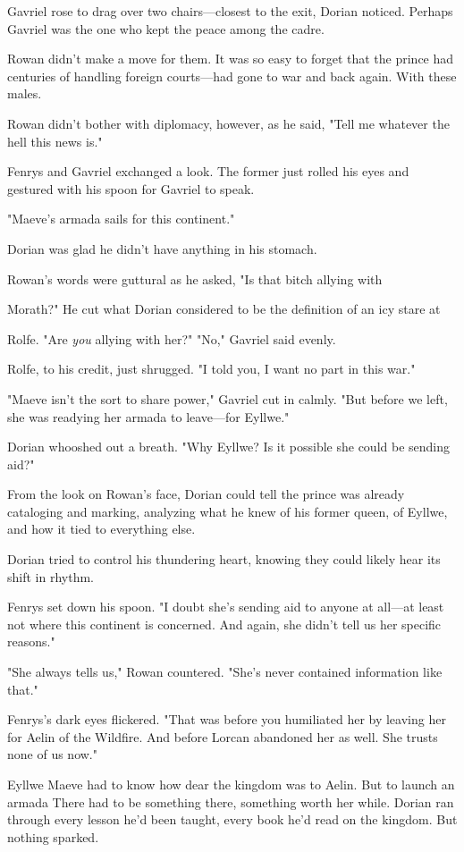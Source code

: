 Gavriel rose to drag over two chairs---closest to the exit, Dorian noticed. Perhaps Gavriel was the one who kept the peace among the cadre.

Rowan didn't make a move for them. It was so easy to forget that the prince had centuries of handling foreign courts---had gone to war and back again. With these males.

Rowan didn't bother with diplomacy, however, as he said, "Tell me whatever the hell this news is."

Fenrys and Gavriel exchanged a look. The former just rolled his eyes and gestured with his spoon for Gavriel to speak.

"Maeve's armada sails for this continent."

Dorian was glad he didn't have anything in his stomach.

Rowan's words were guttural as he asked, "Is that bitch allying with

Morath?" He cut what Dorian considered to be the definition of an icy stare at

Rolfe. "Are \emph{you} allying with her?" "No," Gavriel said evenly.

Rolfe, to his credit, just shrugged. "I told you, I want no part in this war."

"Maeve isn't the sort to share power," Gavriel cut in calmly. "But before we left, she was readying her armada to leave---for Eyllwe."

Dorian whooshed out a breath. "Why Eyllwe? Is it possible she could be sending aid?"

From the look on Rowan's face, Dorian could tell the prince was already cataloging and marking, analyzing what he knew of his former queen, of Eyllwe, and how it tied to everything else.

Dorian tried to control his thundering heart, knowing they could likely hear its shift in rhythm.

Fenrys set down his spoon. "I doubt she's sending aid to anyone at all---at least not where this continent is concerned. And again, she didn't tell us her specific reasons."

"She always tells us," Rowan countered. "She's never contained information like that."

Fenrys's dark eyes flickered. "That was before you humiliated her by leaving her for Aelin of the Wildfire. And before Lorcan abandoned her as well. She trusts none of us now."

Eyllwe  Maeve had to know how dear the kingdom was to Aelin. But to launch an armada  There had to be something there, something worth her while. Dorian ran through every lesson he'd been taught, every book he'd read on the kingdom. But nothing sparked.

